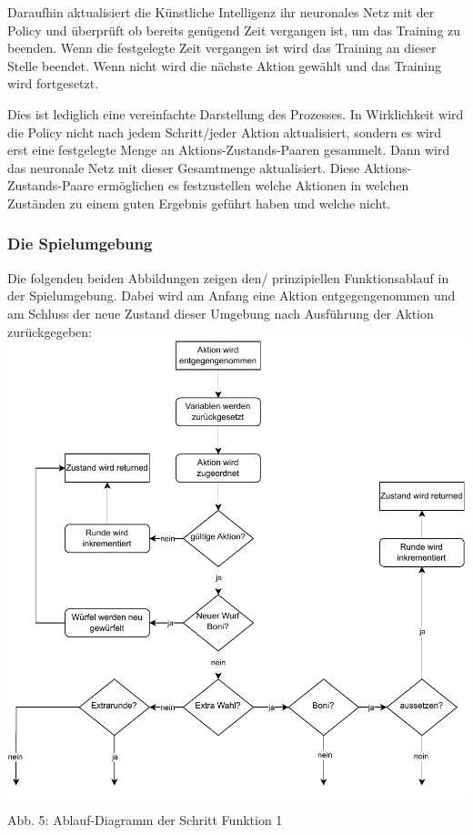Daraufhin aktualisiert die Künstliche Intelligenz ihr neuronales Netz mit der Policy und überprüft ob bereits genügend Zeit vergangen ist, um das Training zu beenden. Wenn die festgelegte Zeit vergangen ist wird das Training an dieser Stelle beendet. Wenn nicht wird die nächste Aktion gewählt und das Training wird fortgesetzt.

Dies ist lediglich eine vereinfachte Darstellung des Prozesses. In Wirklichkeit wird die Policy nicht nach jedem Schritt/jeder Aktion aktualisiert, sondern es wird erst eine festgelegte Menge an Aktions-Zustands-Paaren gesammelt. Dann wird das neuronale Netz mit dieser Gesamtmenge aktualisiert. Diese Aktions-Zustands-Paare ermöglichen es festzustellen welche Aktionen in welchen Zuständen zu einem guten Ergebnis geführt haben und welche nicht.
\subsubsection{Die Spielumgebung}
\begin{minipage}{\linewidth}
	Die folgenden beiden Abbildungen zeigen den/ prinzipiellen Funktionsablauf in der Spielumgebung. Dabei wird am Anfang eine Aktion entgegengenommen und am Schluss der neue Zustand dieser Umgebung nach Ausführung der Aktion zurückgegeben:\\
	
	\vspace{0.5cm}
	\includegraphics[width=1\textwidth]{Bilder/step3.drawio} 
	
	Abb. 5: Ablauf-Diagramm der Schritt Funktion 1 \\
\end{minipage}

